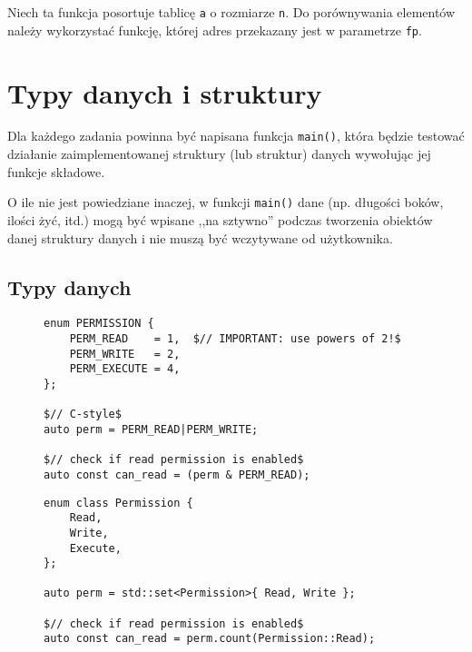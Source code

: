 \documentclass[11pt,a4paper,titlepage,onecolumn]{article}
\begin{document}
Niech ta funkcja posortuje tablicę \texttt{a} o rozmiarze \texttt{n}. Do
porównywania elementów należy wykorzystać funkcję, której adres przekazany jest
w parametrze \texttt{fp}.

\newpage
\section{Typy danych i struktury}

Dla każdego zadania powinna być napisana funkcja \texttt{main()}, która będzie
testować działanie zaimplementowanej struktury (lub struktur) danych wywołując
jej funkcje składowe.

O ile nie jest powiedziane inaczej, w funkcji \texttt{main()} dane (np. długości
boków, ilości żyć, itd.) mogą być wpisane ,,na sztywno'' podczas tworzenia
obiektów danej struktury danych i nie muszą być wczytywane od użytkownika.

\subsection{Typy danych}

\begin{figure}
{\small
\begin{lstlisting}[caption={\texttt{enum}},
    captionpos=b,
    label=listing_0015_enum]
enum PERMISSION {
    PERM_READ    = 1,  $// IMPORTANT: use powers of 2!$
    PERM_WRITE   = 2,
    PERM_EXECUTE = 4,
};

$// C-style$
auto perm = PERM_READ|PERM_WRITE;

$// check if read permission is enabled$
auto const can_read = (perm & PERM_READ);
\end{lstlisting}}
\end{figure}

\begin{figure}
{\small
\begin{lstlisting}[caption={\texttt{enum class}},
    captionpos=b,
    label=listing_0016_enum_class]
enum class Permission {
    Read,
    Write,
    Execute,
};

auto perm = std::set<Permission>{ Read, Write };

$// check if read permission is enabled$
auto const can_read = perm.count(Permission::Read);
\end{lstlisting}}
\end{figure}
\end{document}

